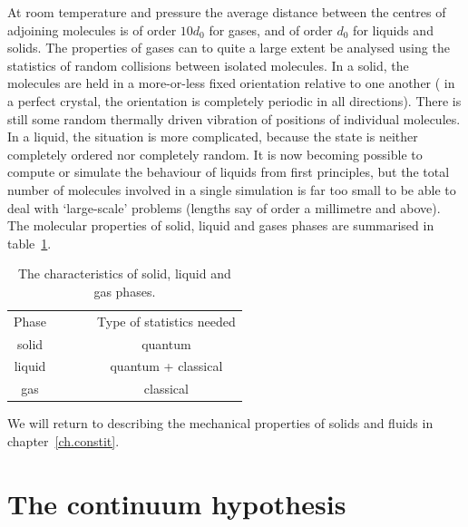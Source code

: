 \documentclass[twoside,11pt]		{report}
\begin{document}
At room temperature and pressure the average distance between the
centres of adjoining molecules is of order $10d_0$ for gases, and of
order $d_0$ for liquids and solids. The properties of gases can to
quite a large extent be analysed using the statistics of random
collisions between isolated molecules. In a solid, the molecules are
held in a more-or-less fixed orientation relative to one another (\eg
in a perfect crystal, the orientation is completely periodic in all
directions). There is still some random thermally driven vibration of
positions of individual molecules. In a liquid, the situation is more
complicated, because the state is neither completely ordered nor
completely random. It is now becoming possible to compute or simulate
the behaviour of liquids from first principles, but the total number
of molecules involved in a single simulation is far too small to be
able to deal with `large-scale' problems (lengths say of order a
millimetre and above). The molecular properties of solid, liquid and
gases phases are summarised in table~\ref{tab.bat1}.

\begin{table}
\begin{center}
\begin{tabular}{cp{25mm}p{35mm}p{28mm}p{30mm} }
\hline
Phase & 
\centering{Intermolecular forces} & 
\centering{Ratio of random thermal movement of molecules to $d_0$} &
\centering{Molecular arrangement} &
Type of statistics needed \\[5pt]
solid & \centering{strong} & 
\centering{$\ll1$} & \centering{ordered} & \multicolumn{1}{c}{quantum} \\
liquid & \centering{medium} & 
\centering{${\cal O}(1)$} & \centering{partially ordered} & \multicolumn{1}{c}{quantum + classical} \\
gas & \centering{weak} & \centering{$\gg1$} & \centering{disordered} &
\multicolumn{1}{c}{classical} \\ \hline
\end{tabular}
\end{center}
\caption{The characteristics of solid, liquid and gas
  phases. \citep[From][]{bat67}}
\label{tab.bat1}
\end{table}

We will return to describing the mechanical properties of solids and
fluids in chapter~\ref{ch.constit}.

\section{The continuum hypothesis}
\end{document}

